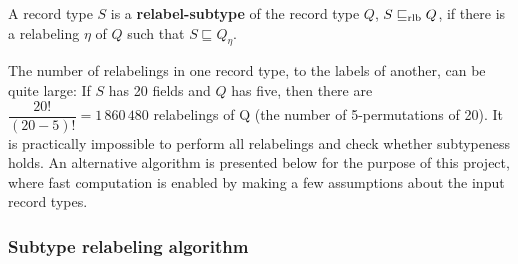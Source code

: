 
\begin{definition}
A record type $S$ is a \textbf{relabel-subtype} of the record type $Q$, $S \mathrel{\sqsubseteq_\text{rlb}} Q$, if there is a relabeling $\eta$ of $Q$ such that $S \sqsubseteq Q_\eta$.

\end{definition}

The number of relabelings in one record type, to the labels of another, can be quite large:
If $S$ has 20 fields and $Q$ has five, then there are $\dfrac{20!}{(20-5)!} = 1\,860\,480$ relabelings of Q (the number of 5-permutations of 20).
It is practically impossible to perform all relabelings and check whether subtypeness holds.
An alternative algorithm is presented below for the purpose of this project, where fast computation is enabled by making a few assumptions about the input record types.

\subsubsection{Subtype relabeling algorithm}

